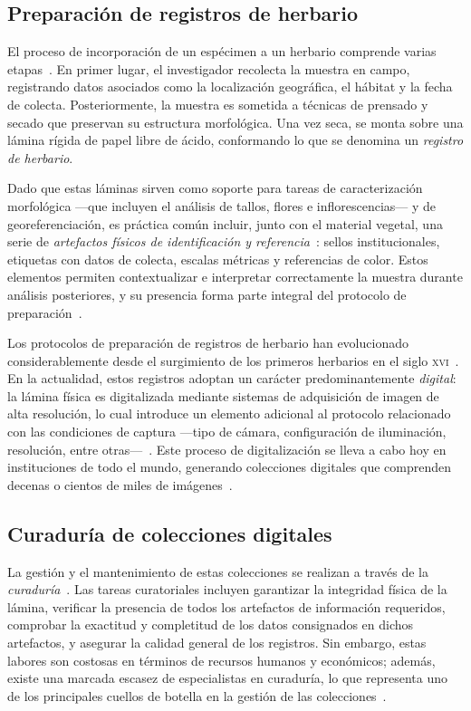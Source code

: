 \subsection*{Preparación de registros de herbario}

El proceso de incorporación de un espécimen a un herbario comprende varias
etapas~\citep{floridaHerbarium, nelsonEtAl2012}. En primer lugar, el investigador
recolecta la muestra en campo, registrando datos asociados como la localización
geográfica, el hábitat y la fecha de colecta. Posteriormente, la muestra es sometida a
técnicas de prensado y secado que preservan su estructura morfológica. Una vez seca, se
monta sobre una lámina rígida de papel libre de ácido, conformando lo que se denomina un
\textit{registro de herbario}.

Dado que estas láminas sirven como soporte para tareas de caracterización morfológica
—que incluyen el análisis de tallos, flores e inflorescencias— y de georeferenciación,
es práctica común incluir, junto con el material vegetal, una serie de \textit{artefactos
físicos de identificación y referencia}~\citep{hussein2021, waltonEtAl2023}: sellos
institucionales, etiquetas con datos de colecta, escalas métricas y referencias de color.
Estos elementos permiten contextualizar e interpretar correctamente la muestra durante
análisis posteriores, y su presencia forma parte integral del protocolo de
preparación~\citep{weberEtAl2020}.

Los protocolos de preparación de registros de herbario han evolucionado considerablemente
desde el surgimiento de los primeros herbarios en el siglo \textsc{xvi}~\citep{domingos2023}.
En la actualidad, estos registros adoptan un carácter predominantemente \textit{digital}:
la lámina física es digitalizada mediante sistemas de adquisición de imagen de alta
resolución, lo cual introduce un elemento adicional al protocolo relacionado con las
condiciones de captura —tipo de cámara, configuración de iluminación, resolución, entre
otras—~\citep{desmedt2024}. Este proceso de digitalización se lleva a cabo hoy en
instituciones de todo el mundo, generando colecciones digitales que comprenden decenas o
cientos de miles de imágenes~\citep{klopper2025, heberling2019}.

\subsection*{Curaduría de colecciones digitales}

La gestión y el mantenimiento de estas colecciones se realizan a través de la
\textit{curaduría}~\citep{paton2025}. Las tareas curatoriales incluyen garantizar la
integridad física de la lámina, verificar la presencia de todos los artefactos de
información requeridos, comprobar la exactitud y completitud de los datos consignados en
dichos artefactos, y asegurar la calidad general de los registros. Sin embargo, estas
labores son costosas en términos de recursos humanos y económicos; además, existe una
marcada escasez de especialistas en curaduría, lo que representa uno de los principales
cuellos de botella en la gestión de las colecciones~\citep{farrugiaEtAl2022,
waltonEtAl2023}.

